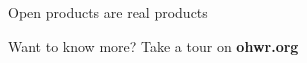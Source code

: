 \documentclass[compress,red]{beamer}
\begin{document}
\begin{frame}{Open products are real products\textsuperscript{\texttrademark}}

  \begin{center}
  \end{center}

  \begin{block}{}
    \begin{center}
    Want to know more? Take a tour on \textbf{ohwr.org}
    \end{center}
  \end{block}

  \note[item]{}

\end{frame}




\begin{comment}


\end{comment}
\end{document}
